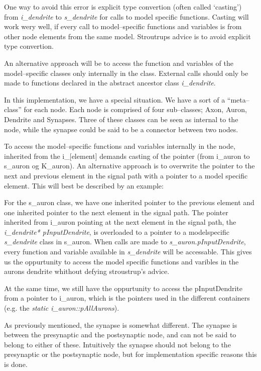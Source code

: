 	One way to avoid this error is explicit type convertion (often called `casting') from \emph{i\_dendrite} to \emph{s\_dendrite} for calls to model specific functions.
	Casting will work wery well, if every call to model--specific functions and variables is from other node elements from the same model.
	Stroutrups advice is to avoid explicit type convertion\cite{Stroustrup2000KAP6}. 
	
	An alternative approach will be to access the function and variables of the model--specific classes only internally in the class. 
	External calls should only be made to functions declared in the abstract ancestor class \emph{i\_dendrite}.

	In this implementation, we have a special situation. We have a sort of a ``meta--class'' for each node. Each node is comprised of four sub--classes; Axon, Auron, Dendrite and Synapses. 
	Three of these classes can be seen as internal to the node, while the synapse could be said to be a connector between two nodes.

	To access the model--specific functions and variables internally in the node, inherited from the i\_[element] demands casting of the pointer (from i\_auron to s\_auron og K\_auron). 
	An alternative approach is to overwrite the pointer to the next and previous element in the signal path with a pointer to a model specific element.
	This will best be described by an example:

	For the s\_auron class, we have one inherited pointer to the previous element and one inherited pointer to the next element in the signal path.
	The pointer inherited from i\_auron pointing at the next element in the signal path, the \emph{i\_dendrite* pInputDendrite}, is overloaded to a pointer to a modelspecific \emph{s\_dendrite} class in s\_auron.
	When calls are made to \emph{s\_auron.pInputDendrite}, every function and variable available in \emph{s\_dendrite} will be accessable.
	This gives us the oppurtunity to access the model specific functions and varibles in the aurons dendrite whithout defying stroustrup's advice.

	At the same time, we still have the oppurtunity to access the pInputDendrite from a pointer to i\_auron, which is the pointers used in the different containers (e.g. the \emph{static i\_auron::pAllAurons}).
	
	As previously mentioned, the synapse is somewhat different. 
	The synapse is between the presynaptic and the postsynaptic node, and can not be said to belong to either of these. 
	Intuitively the synapse should not belong to the presynaptic or the postsynaptic node, but for implementation specific reasons this is done.


